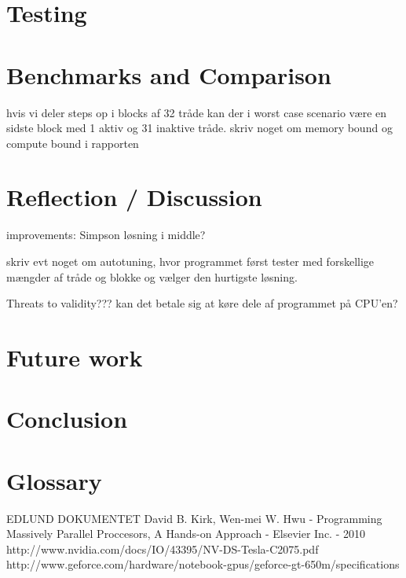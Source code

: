 \documentclass[oribibl]{llncs}
\begin{document}
	
	\label{cuda}
		
	\section{Testing}
		
	
	\label{testing}
		
	\section{Benchmarks and Comparison}
		hvis vi deler steps op i blocks af 32 tråde kan der i worst case scenario være en sidste block med 1 aktiv og 31 inaktive tråde.
		skriv noget om memory bound og compute bound i rapporten
	
	\label{bandc}
	
	\section{Reflection / Discussion}
	improvements:
	Simpson løsning i middle?
		
		skriv evt noget om autotuning, hvor programmet først tester med forskellige mængder af tråde og blokke og vælger den hurtigste løsning.
		
		Threats to validity???
		kan det betale sig at køre dele af programmet på CPU'en?
		
	
	\label{reflection}
		
	\section{Future work}
	
	
	\label{futurework}
	
	\section{Conclusion}
	
	
	\label{conclusion}
		
	\section{Glossary}
	
	
		
	\begin{thebibliography}{9}
			 EDLUND DOKUMENTET
			 David B. Kirk, Wen-mei W. Hwu - Programming Massively Parallel Proccesors, A Hands-on Approach - Elsevier Inc. - 2010
			 http://www.nvidia.com/docs/IO/43395/NV-DS-Tesla-C2075.pdf
			 http://www.geforce.com/hardware/notebook-gpus/geforce-gt-650m/specifications
	\end{thebibliography}
	
\end{document}

